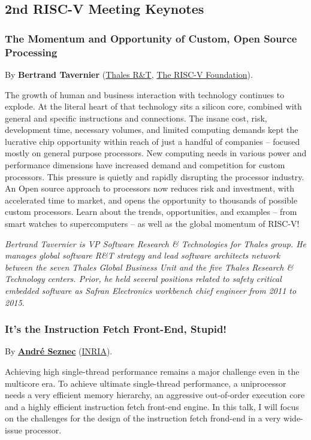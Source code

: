 \documentclass[a4paper, 10pt]{article}
\begin{document}
{\subsection{2nd RISC-V Meeting Keynotes}
\label{sec:org224aa82}
\subsubsection{The Momentum and Opportunity of Custom, Open Source Processing}
\label{sec:orgf6daae1}
By \textbf{Bertrand Tavernier} (\href{https://www.thalesgroup.com/en/global/innovation/research-and-technology}{Thales R\&T}, \href{https://riscv.org}{The RISC-V Foundation}).

The growth of human and business interaction with technology continues
to explode. At the literal heart of that technology sits a silicon
core, combined with general and specific instructions and
connections. The insane cost, risk, development time, necessary
volumes, and limited computing demands kept the lucrative chip
opportunity within reach of just a handful of companies -- focused
mostly on general purpose processors. New computing needs in various
power and performance dimensions have increased demand and competition
for custom processors. This pressure is quietly and rapidly disrupting
the processor industry. An Open source approach to processors now
reduces risk and investment, with accelerated time to market, and
opens the opportunity to thousands of possible custom
processors. Learn about the trends, opportunities, and examples --
from smart watches to supercomputers -- as well as the global momentum
of RISC-V!

\emph{\footnotesize Bertrand Tavernier is VP Software Research \& Technologies for Thales group. He manages global software R\&T strategy and lead software architects network between the seven Thales Global Business Unit and the five Thales Research \& Technology centers. Prior, he held several positions related to safety critical embedded software as Safran Electronics workbench chief engineer from 2011 to 2015.}

\subsubsection{It's the Instruction Fetch Front-End, Stupid!}
\label{sec:org9d270ea}
By \textbf{\href{https://team.inria.fr/pacap/members/andre-seznec}{André Seznec}}
(\href{https://www.inria.fr}{INRIA}).

Achieving high single-thread performance remains a major challenge even
in the multicore era. To achieve ultimate single-thread performance, a
uniprocessor needs a very efficient memory hierarchy, an aggressive
out-of-order execution core and a highly efficient instruction fetch
front-end engine.
In this talk, I will focus on the challenges for the design of the
instruction fetch frond-end in a very wide-issue processor.

}
\end{document}
